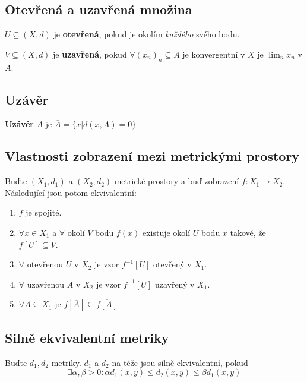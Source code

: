 \documentclass[10pt]{article}
\begin{document}
\subsection{Otevřená a uzavřená množina}
\hspace{1.2mm}
\noindent
$U \subseteq (X,d)$ je \textbf{otevřená}, pokud je okolím \textit{každého} svého bodu.

\vspace{5mm}

\hspace{1.2mm}
\noindent $V \subseteq (X,d)$ je \textbf{uzavřená}, pokud $\forall (x_n)_n \subseteq A$ je konvergentní
v $X$ je $\lim_n x_n$ v $A$.

\subsection{Uzávěr}
\hspace{1.2mm}
\noindent
\textbf{Uzávěr} $A$ je $\overline{A} = \{ x | d(x,A) = 0 \}$

\subsection{Vlastnosti zobrazení mezi metrickými prostory}
\hspace{1.2mm}
\noindent
Buďte $(X_1, d_1)$ a $(X_2, d_2)$ metrické prostory a buď zobrazení $f: X_1 \to X_2$. Následující
jsou potom ekvivalentní:
\begin{enumerate}
    \item $f$ je spojité.
    \item $\forall x \in X_1$ a $\forall$ okolí $V$ bodu $f(x)$ existuje okolí $U$ bodu $x$ takové, že
        $f[U] \subseteq V$.
    \item $\forall$ otevřenou $U$ v $X_2$ je vzor $f^{-1}[U]$ otevřený v $X_1$.
    \item $\forall$ uzavřenou $A$ v $X_2$ je vzor $f^{-1}[U]$ uzavřený v $X_1$.
    \item $\forall A \subseteq X_1$ je $f[\overline{A}] \subseteq \overline{f[A]}$
\end{enumerate}


\subsection{Silně ekvivalentní metriky}
\hspace{1.2mm}
\noindent
Buďte $d_1, d_2$ metriky. $d_1$ a $d_2$ na téže jsou silně ekvivalentní, pokud
\[\exists \alpha , \beta > 0: \alpha d_1(x,y) \leq d_2(x,y) \leq \beta d_1(x,y)\]
\end{document}
